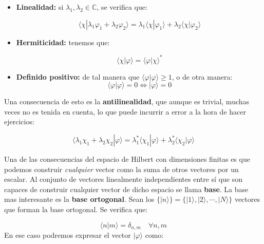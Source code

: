 \documentclass[12pt,a4paper]{book}
\numberwithin{equation}{chapter}
\numberwithin{figure}{chapter}
\begin{document}
\begin{itemize}
\item \textbf{Linealidad:} si $\lambda_1, \lambda_2 \in  \mathbb{C}$, se verifica que:

\begin{equation}
\langle \chi | \lambda_1 \varphi_1 + \lambda_2 \varphi_2 \rangle = \lambda_1 \langle \chi | \varphi_1 \rangle + \lambda_2 \langle \chi | \varphi_2 \rangle
\end{equation}
\item \textbf{Hermiticidad:} tenemos que:

\begin{equation}
\langle \chi | \varphi \rangle = \langle \varphi | \chi \rangle^*
\end{equation}
\item \textbf{Definido positivo:} de tal manera que $\langle \varphi | \varphi \rangle \geq 1$, o de otra manera:
\begin{equation}
\langle \varphi | \varphi \rangle = 0 \Longleftrightarrow | \varphi \rangle = 0
\end{equation}

\end{itemize}

Una consecuencia de esto es la \textbf{antilinealidad}, que aunque es trivial, muchas veces no es tenida en cuenta, lo que puede incurrir a error a la hora de hacer ejercicios:

\begin{equation}
\langle  \lambda_1 \chi_1 + \lambda_2 \chi_2  | \varphi \rangle = \lambda_1^* \langle \chi_1 | \varphi \rangle + \lambda_2^* \langle \chi_2 | \varphi \rangle
\end{equation}

Una de las consecuencias del espacio de Hilbert con dimensiones finitas es que podemos construir \textit{cualquier} vector como la suma de otros vectores por un escalar. Al conjunto de vectores linealmente independientes entre sí que son capaces de construir cualquier vector de dicho espacio se llama \textbf{base}. La base mas interesante es la \textbf{base ortogonal}. Sean los $\{ | n \rangle \} = \{ | 1 \rangle , | 2 \rangle , \cdots, | N \rangle \}$ vectores que forman la base ortogonal. Se verifica que:

\begin{equation}
\langle n | m \rangle = \delta_{n,m} \quad \forall n,m
\end{equation}
En ese caso podremos expresar el vector $| \varphi \rangle$ como:
\end{document}
